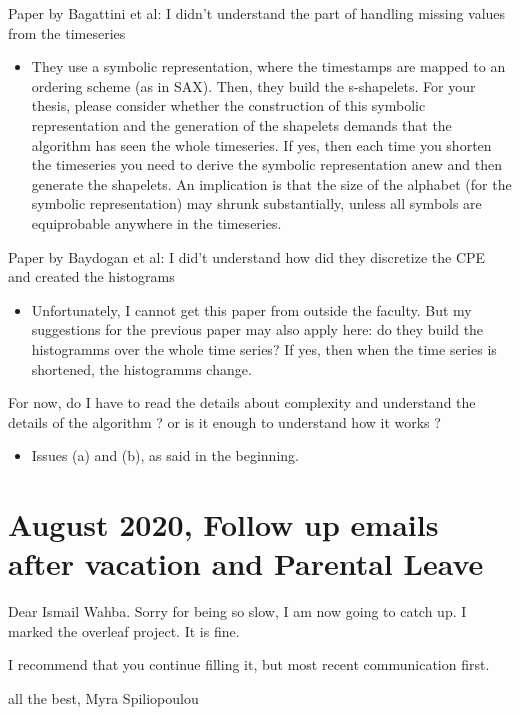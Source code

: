 \documentclass{article}
\newcommand{\cmark}{\ding{51}}%
\newcommand{\done}{\rlap{$\square$}{\raisebox{2pt}{\large\hspace{1pt}\cmark}}%
\hspace{-2.5pt}}
\begin{document}
	\begin{todolist}
		\item [\done] Paper by Bagattini et al: I didn't understand the part of handling missing values from the timeseries
			\begin{itemize}
				\item [\done] They use a symbolic representation, where the timestamps are mapped to an ordering scheme (as in SAX). Then, they build the s-shapelets. For your thesis, please consider whether the construction of this symbolic representation and the generation of the shapelets demands that the algorithm has seen the whole timeseries. If yes, then each time you shorten the timeseries you need to derive the symbolic representation anew and then generate the shapelets. An implication is that the size of the alphabet (for the symbolic representation) may shrunk substantially, unless all symbols are equiprobable anywhere in the timeseries.
			\end{itemize}
		\item Paper by Baydogan et al: I did't understand how did they discretize the CPE and created the histograms
			\begin{itemize}
				\item Unfortunately, I cannot get this paper from outside the faculty. But my suggestions for the previous paper may also apply here: do they build the histogramms over the whole time series? If yes, then when the time series is shortened, the histogramms change.
			\end{itemize}
		\item [\done] For now, do I have to read the details about complexity and understand the details of the algorithm ? or is it enough to understand how it works ?
			\begin{itemize}
				\item Issues (a) and (b), as said in the beginning.
			\end{itemize}
	\end{todolist}

\section*{\texorpdfstring{}. August 2020, Follow up emails after vacation and Parental Leave}
Dear Ismail Wahba.
Sorry for being so slow, I am now going to catch up. I marked the overleaf project. It is fine.
	\begin{todolist}
		\item [\done] I recommend that you continue filling it, but most recent communication first.
	\end{todolist}
all the best,
Myra Spiliopoulou
\end{document}
